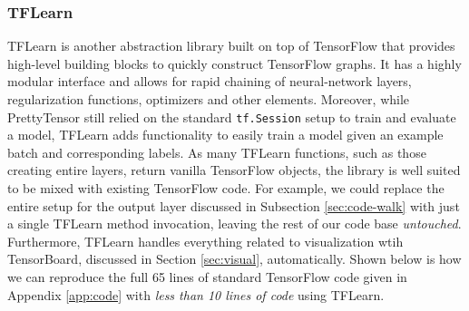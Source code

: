 \subsubsection{TFLearn}\label{sec:code-abstract-prettytensor}

TFLearn is another abstraction library built on top of TensorFlow that provides
high-level building blocks to quickly construct TensorFlow graphs. It has a
highly modular interface and allows for rapid chaining of neural-network layers,
regularization functions, optimizers and other elements. Moreover, while
PrettyTensor still relied on the standard \texttt{tf.Session} setup to train and
evaluate a model, TFLearn adds functionality to easily train a model given an
example batch and corresponding labels. As many TFLearn functions, such as those
creating entire layers, return vanilla TensorFlow objects, the library is well
suited to be mixed with existing TensorFlow code. For example, we could replace
the entire setup for the output layer discussed in Subsection
\ref{sec:code-walk} with just a single TFLearn method invocation, leaving the
rest of our code base \emph{untouched}. Furthermore, TFLearn handles everything
related to visualization wtih TensorBoard, discussed in Section
\ref{sec:visual}, automatically. Shown below is how we can reproduce the full 65
lines of standard TensorFlow code given in Appendix \ref{app:code} with
\emph{less than 10 lines of code} using TFLearn.



